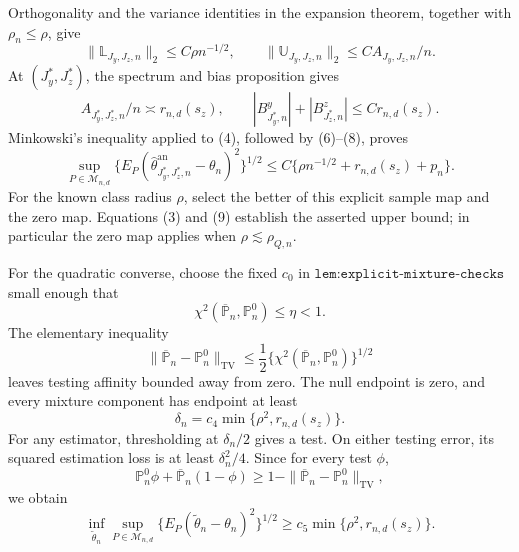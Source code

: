 Orthogonality and the variance identities in the expansion theorem, together with \(\rho_n\le\rho\), give
\[
\|\mathbb L_{J_y,J_z,n}\|_2\le C\rho n^{-1/2},
\qquad
\|\mathbb U_{J_y,J_z,n}\|_2\le C A_{J_y,J_z,n}/n.     \tag{7}
\]
At \((J_y^*,J_z^*)\), the spectrum and bias proposition gives
\[
A_{J_y^*,J_z^*,n}/n\asymp r_{n,d}(s_z),\qquad
|B^y_{J_y^*,n}|+|B^z_{J_z^*,n}|\le Cr_{n,d}(s_z).     \tag{8}
\]
Minkowski's inequality applied to (4), followed by (6)--(8), proves
\[
\sup_{P\in\mathcal M_{n,d}}
\{E_P(\widehat\theta^{\mathrm{an}}_{J_y^*,J_z^*,n}-\theta_n)^2\}^{1/2}
\le C\{\rho n^{-1/2}+r_{n,d}(s_z)+p_n\}.             \tag{9}
\]
For the known class radius \(\rho\), select the better of this explicit sample map and the zero map. Equations (3) and (9) establish the asserted upper bound; in particular the zero map applies when \(\rho\lesssim\rho_{Q,n}\).

For the quadratic converse, choose the fixed \(c_0\) in \(\texttt{lem:explicit-mixture-checks}\) small enough that
\[
\chi^2(\overline{\mathbb P}_n,\mathbb P_n^0)\le\eta<1.
\]
The elementary inequality
\[
\|\overline{\mathbb P}_n-\mathbb P_n^0\|_{\mathrm{TV}}
\le\frac12\{\chi^2(\overline{\mathbb P}_n,\mathbb P_n^0)\}^{1/2}
\]
leaves testing affinity bounded away from zero. The null endpoint is zero, and every mixture component has endpoint at least
\[
\delta_n=c_4\min\{\rho^2,r_{n,d}(s_z)\}.
\]
For any estimator, thresholding at \(\delta_n/2\) gives a test. On either testing error, its squared estimation loss is at least \(\delta_n^2/4\). Since for every test \(\phi\),
\[
\mathbb P_n^0\phi+\overline{\mathbb P}_n(1-\phi)
\ge1-\|\overline{\mathbb P}_n-\mathbb P_n^0\|_{\mathrm{TV}},
\]
we obtain
\[
\inf_{\widetilde\theta_n}\sup_{P\in\mathcal M_{n,d}}
\{E_P(\widetilde\theta_n-\theta_n)^2\}^{1/2}
\ge c_5\min\{\rho^2,r_{n,d}(s_z)\}.                  \tag{10}
\]

